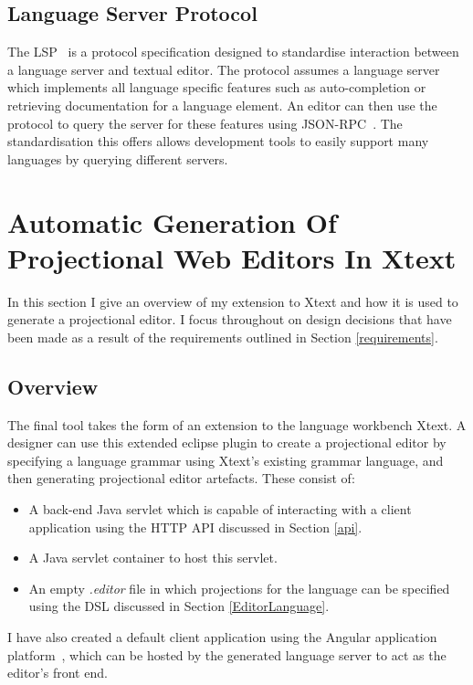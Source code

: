 \documentclass{article}
\begin{document}
\subsection{Language Server Protocol}\label{lsp}
The LSP~\cite{lsp} is a protocol specification designed to standardise interaction between a language server and textual editor. The protocol assumes a language server which implements all language specific features such as auto-completion or retrieving documentation for a language element. An editor can then use the protocol to query the server for these features using JSON-RPC~\cite{jsonrpc}. The standardisation this offers allows development tools to easily support many languages by querying different servers.
%
%
%
%
%
%
\section{Automatic Generation Of Projectional Web Editors In Xtext}\label{generation}
In this section I give an overview of my extension to Xtext and how it is used to generate a projectional editor. I focus throughout on design decisions that have been made as a result of the requirements outlined in Section \ref{requirements}. 

\subsection{Overview}

The final tool takes the form of an extension to the language workbench Xtext. A designer can use this extended eclipse plugin to create a projectional editor by specifying a language grammar using Xtext's existing grammar language, and then generating projectional editor artefacts. These consist of:
\begin{itemize}
\item A back-end Java servlet which is capable of interacting with a client application using the HTTP API discussed in Section \ref{api}.
\item A Java servlet container to host this servlet.
\item An empty \emph{.editor} file in which projections for the language can be specified using the DSL discussed in Section \ref{EditorLanguage}. 
\end{itemize}
%
I have also created a default client application using the Angular application platform~\cite{angular}, which can be hosted by the generated language server to act as the editor's front end. 
\end{document}
